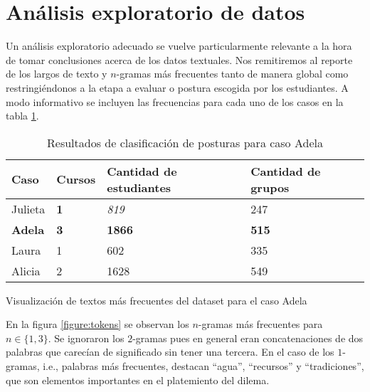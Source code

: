 \documentclass[
	spanish, %
	letterpaper, oneside
]{article}
\begin{document}
\section{Análisis exploratorio de datos}

Un análisis exploratorio adecuado se vuelve particularmente relevante a la hora de tomar conclusiones acerca de los datos textuales. Nos remitiremos al reporte de los largos de texto y $n$-gramas más frecuentes tanto de manera global como restringiéndonos a la etapa a evaluar o postura escogida por los estudiantes. A modo informativo se incluyen las frecuencias para cada uno de los casos en la tabla \ref{tab:freqs_casos}.

\begin{table}[htbp]
\centering
\caption{Resultados de clasificación de posturas para caso Adela}
\begin{tabular}{|l|l|l|l|}
\hline
\textbf{Caso}  & \textbf{Cursos} & \textbf{Cantidad de estudiantes} & \textbf{Cantidad de grupos} \\ \hline
Julieta        & \textbf{1}      & \textit{819}                     & 247                         \\ \hline
\textbf{Adela} & \textbf{3}      & \textbf{1866}                    & \textbf{515}                \\ \hline
Laura          & 1               & 602                              & 335                         \\ \hline
Alicia         & 2               & 1628                             & 549                         \\ \hline
\end{tabular}
\label{tab:freqs_casos}
\end{table}

\begin{images}[\label{figure:tokens}]{Visualización de textos más frecuentes del dataset para el caso Adela}
    \imagesnewline
\end{images}

En la figura \ref{figure:tokens} se observan los $n$-gramas más frecuentes para $n \in \{ 1, 3 \}$. Se ignoraron los $2$-gramas pues en general eran concatenaciones de dos palabras que carecían de significado sin tener una tercera. En el caso de los $1$-gramas, i.e., palabras más frecuentes, destacan ``agua'', ``recursos'' y ``tradiciones'', que son elementos importantes en el platemiento del dilema.
\end{document}
